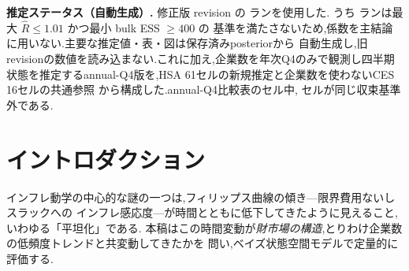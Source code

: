 \documentclass[11pt]{article}
\newcommand{\kt}{\kappa_t}
\begin{document}





\begin{center}
\small\colorbox{blue!5}{\parbox{0.91\linewidth}{
\textbf{推定ステータス（自動生成）.}
修正版 revision \ReportEstimationRevision{} の \ReportRunCount{} ランを使用した.
うち \ReportWarningCount{} ランは最大 $\hat R\leq1.01$ かつ最小 bulk ESS $\geq400$ の
基準を満たさないため,係数を主結論に用いない.主要な推定値・表・図は保存済みposteriorから
自動生成し,旧revisionの数値を読み込まない.これに加え,企業数を年次Q4のみで観測し四半期
状態を推定するannual-Q4版を,HSA 61セルの新規推定と企業数を使わないCES 16セルの共通参照
から構成した.annual-Q4比較表の\AnnualReportRunCount{}セル中,
\AnnualReportWarningCount{}セルが同じ収束基準外である.}}
\end{center}

\begin{abstract}
\noindent 本稿は,ニューケインジアン・フィリップス曲線(NKPC)の傾きが財市場の構造と
共変動してきたかを問う.Matsuyama--Ushchev の Homothetic Single Aggregator (HSA)需要体系に
基づき,$\kt=\kappa_0+\delta\bar N_t$ を含む状態空間モデルをGibbs/FFBSで推定する.
修正後の主標本は1982Q1--2012Q4 ($T=124$),各仕様2チェーン・12,000反復である.
HSA steady・失業ギャップでは,ヘッドラインCPIの
$\delta=\HeadlineUnempDelta$ ($\mathrm{BF}_{10}=\HeadlineUnempDeltaBF$),コアCPIの
$\delta=\CoreUnempDelta$ ($\mathrm{BF}_{10}=\CoreUnempDeltaBF$)が正である.含意される
$\kt$ はコアCPIで $\CoreUnempKappaStart$ から $\CoreUnempKappaEnd$ へ低下する.
出力ギャップ別の結果は補論に分離する.一方,理論の左辺に近いPPIでは
$\delta=\PPIUnempDelta$ ($\mathrm{BF}_{10}=\PPIUnempDeltaBF$)で,失業・HP・BNの全てが
ゼロを含む.したがってCPIの関係は川上価格一般には確認されない.また,const-theta/fullの
多くは再推定後も収束せず,循環的参入経路の確認は未了である.さらに,理論論文の
CES推定量の負のバイアス予測を,逆マークアップを用いたCES--HSA dynamic比較で直接評価する.
annual-Q4版では$\delta$の周辺鎖と点推定はCPI結果を概ね再現するが,潜在状態経路とAR(2)
ブロックは収束基準外であり,完全な頑健性確認には数えない.結果は因果効果ではなく,HSAの
符号予測と整合する時系列上の証拠として読む.
\end{abstract}
\tableofcontents
\clearpage

\section{イントロダクション}
インフレ動学の中心的な謎の一つは,フィリップス曲線の傾き---限界費用ないしスラックへの
インフレ感応度---が時間とともに低下してきたように見えること,いわゆる「平坦化」である.
本稿はこの時間変動が\emph{財市場の構造},とりわけ企業数の低頻度トレンドと共変動してきたかを
問い,ベイズ状態空間モデルで定量的に評価する.
\end{document}
